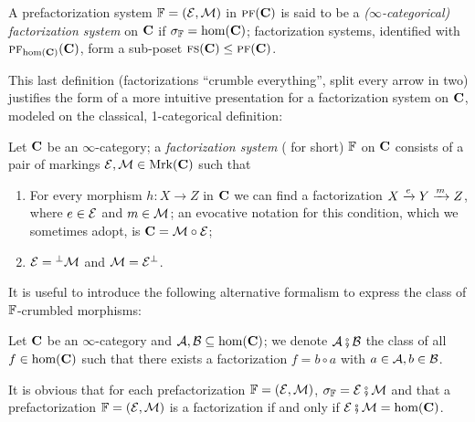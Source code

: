 \begin{definition}
\begin{definition}\label{def:effe.esse}
A prefactorization system $\mathbb{F}=(\mathcal{E},\mathcal{M})$ in $\text{\scshape pf}(\mathbf{C})$ is said to be a \emph{($\infty$\hyp{}categorical) factorization system} on $\mathbf{C}$ if $\sigma_{\mathbb{F}}=\text{hom}(\mathbf{C})$; factorization systems, identified with $\text{\scshape pf}_{\text{hom}(\mathbf{C})}(\mathbf{C})$, form a sub\hyp{}poset $\text{\scshape fs}(\mathbf{C})\leq \text{\scshape pf}(\mathbf{C})$.
\end{definition}
This last definition (factorizations ``crumble everything'', \ie split every arrow in two) justifies the form of a more intuitive presentation for a factorization system on $\mathbf{C}$, modeled on the classical, 1\hyp{}categorical definition:
\begin{definition}\label{def:effe.esse2}
Let $\mathbf{C}$ be an $\infty$\hyp{}category; a \emph{factorization system} ( for short) $\mathbb{F}$ on $\mathbf{C}$ consists of a pair of markings $\mathcal{E}, \mathcal{M}\in\text{Mrk}(\mathbf{C})$ such that
\begin{enumerate}
\item For every morphism $h\colon X\to Z$ in $\mathbf{C}$ we can find a factorization $X\xrightarrow{e} Y\xrightarrow{m} Z$, where $e\in\mathcal{E}$ and $m\in\mathcal{M}$; an evocative notation for this condition, which we sometimes adopt, is $\mathbf{C} = \mathcal{M}\circ \mathcal{E}$;
\item $\mathcal{E} ={}^{\perp}\mathcal{M}$ and $\mathcal{M} = \mathcal{E}^{\perp}$.
\end{enumerate}
\end{definition}
It is useful to introduce the following alternative formalism to express the class of $\mathbb{F}$\hyp{}crumbled morphisms:
\begin{definition}\label{fat.notation}
Let $\mathbf{C}$ be an $\infty$\hyp{}category and $\mathcal{A},\mathcal{B}\subseteq \text{hom}(\mathbf{C})$; we denote $\mathcal{A}\fatsemi \mathcal{B}$ the class of all $f\in\text{hom}(\mathbf{C})$ such that there exists a factorization $f = b\circ a$ with $a\in\mathcal{A}, b\in\mathcal{B}$. 
\end{definition}
It is obvious that for each prefactorization $\mathbb{F} = (\mathcal{E},\mathcal{M})$, $\sigma_{\mathbb{F}} = \mathcal{E}\fatsemi \mathcal{M}$ and that a prefactorization $\mathbb{F} = (\mathcal{E},\mathcal{M})$ is a factorization if and only if $\mathcal{E}\fatsemi\mathcal{M} = \text{hom}(\mathbf{C})$.


\end{definition}
